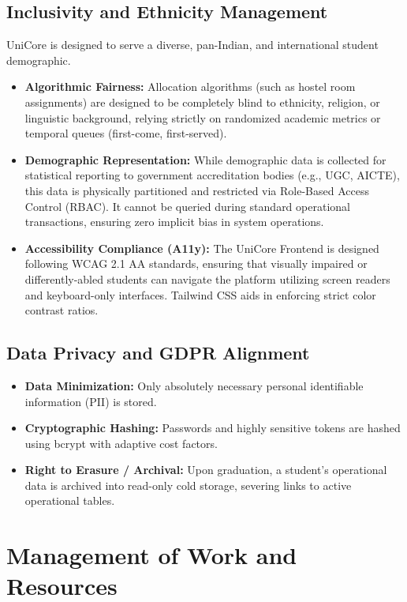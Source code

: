 \documentclass[11pt,a4paper]{article}
\begin{document}
\subsection{Inclusivity and Ethnicity Management}
UniCore is designed to serve a diverse, pan-Indian, and international student demographic.
\begin{itemize}
    \item \textbf{Algorithmic Fairness:} Allocation algorithms (such as hostel room assignments) are designed to be completely blind to ethnicity, religion, or linguistic background, relying strictly on randomized academic metrics or temporal queues (first-come, first-served).
    \item \textbf{Demographic Representation:} While demographic data is collected for statistical reporting to government accreditation bodies (e.g., UGC, AICTE), this data is physically partitioned and restricted via Role-Based Access Control (RBAC). It cannot be queried during standard operational transactions, ensuring zero implicit bias in system operations.
    \item \textbf{Accessibility Compliance (A11y):} The UniCore Frontend is designed following WCAG 2.1 AA standards, ensuring that visually impaired or differently-abled students can navigate the platform utilizing screen readers and keyboard-only interfaces. Tailwind CSS aids in enforcing strict color contrast ratios.
\end{itemize}

\subsection{Data Privacy and GDPR Alignment}
\begin{itemize}
    \item \textbf{Data Minimization:} Only absolutely necessary personal identifiable information (PII) is stored.
    \item \textbf{Cryptographic Hashing:} Passwords and highly sensitive tokens are hashed using bcrypt with adaptive cost factors.
    \item \textbf{Right to Erasure / Archival:} Upon graduation, a student's operational data is archived into read-only cold storage, severing links to active operational tables.
\end{itemize}


\section{Management of Work and Resources}
\end{document}
